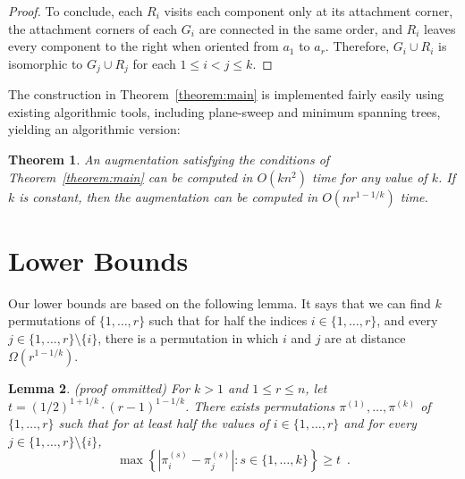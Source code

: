 \documentclass{patmorin}
\newcommand{\appendixproof}{(proof ommitted)\xspace}
\newtheorem{theorem}{Theorem}[section]
\newtheorem{lemma}[theorem]{Lemma}
\DeclareMathOperator{\rank}{rank}
\begin{document}
\begin{proof}

To conclude, each $R_i$ visits each component only at its attachment corner, the attachment corners of each $G_i$ are connected in the same order, and $R_i$ leaves every component to the right when oriented from $a_1$ to $a_r$. Therefore, $G_i\cup R_i$ is isomorphic to $G_j\cup R_j$ for each $1\leq i<j\leq k$.
\end{proof}


The construction in Theorem~\ref{theorem:main} is implemented fairly easily using existing algorithmic tools, including plane-sweep and minimum spanning trees, yielding an algorithmic version:

\begin{theorem}
  An augmentation satisfying the conditions of Theorem~\ref{theorem:main}
  can be computed in $O(kn^2)$ time for any value of $k$.  If $k$ is
  constant, then the augmentation can be computed in $O(nr^{1-1/k})$
  time.
\end{theorem}



\section{Lower Bounds}\label{section:Lower bound}
Our lower bounds are based on the following lemma. It says that we can find $k$ permutations of $\{1,\ldots,r\}$ such that for half the indices $i\in\{1,\ldots,r\}$, and every $j\in\{1,\ldots,r\}\setminus\{i\}$, there is a permutation in which $i$ and $j$ are at distance $\Omega(r^{1-1/k})$.

\begin{lemma}\label{lem:permutations}\appendixproof
For $k>1$ and $1\leq r\leq n$, let $t=(1/2)^{1+1/k}\cdot(r-1)^{1-1/k}$.  There exists permutations $\pi^{(1)},\ldots,\pi^{(k)}$ of $\{1,\ldots,r\}$ such that for at least half the values of $i\in\{1,\ldots,r\}$ and for every $j\in\{1,\ldots,r\}\setminus\{i\}$,
\begin{equation}
 \max\left\{\left|\pi^{(s)}_i-\pi^{(s)}_j\right|\colon s\in\{1,\ldots,k\} \right\}
 \ge t \enspace .
     \label{eq:perm}
\end{equation}
\end{lemma}
\end{document}
